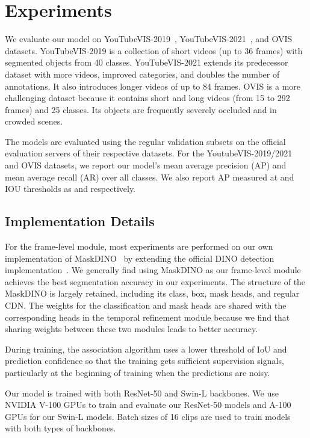 \section{Experiments}
\label{sec:experiments}

We evaluate our model on YouTubeVIS-2019~\cite{yang2019video}, YouTubeVIS-2021~\cite{youtubevis2021}, and OVIS\cite{qi2022occluded} datasets.
YouTubeVIS-2019 is a collection of short videos (up to 36 frames) with segmented objects from 40 classes.
YouTubeVIS-2021 extends its predecessor dataset with more videos, improved categories, and doubles the number of annotations. It also introduces longer videos of up to 84 frames.
OVIS is a more challenging dataset because it contains short and long videos (from 15 to 292 frames) and 25 classes. Its objects are frequently severely occluded and in crowded scenes.

The models are evaluated using the regular validation subsets on the official evaluation servers of their respective datasets. For the YoutubeVIS-2019/2021 and OVIS datasets, we report our model's mean average precision (AP) and mean average recall (AR) over all classes. We also report AP measured at  and  IOU thresholds as  and  respectively.


\subsection{Implementation Details}
\label{sec:build_model}

For the frame-level module, most experiments are performed on our own implementation of MaskDINO~\cite{li2022maskdino} by extending the official DINO detection implementation~\cite{zhang2022dino}. We generally find using MaskDINO as our frame-level module achieves the best segmentation accuracy in our experiments. The structure of the MaskDINO is largely retained, including its class, box, mask heads, and regular CDN. The weights for the classification and mask heads are shared with the corresponding heads in the temporal refinement module because we find that sharing weights between these two modules leads to better accuracy.





During training, the association algorithm uses a lower threshold of IoU and prediction confidence so that the training gets sufficient supervision signals, particularly at the beginning of training when the predictions are noisy.

Our model is trained with both ResNet-50 and Swin-L backbones. We use NVIDIA V-100 GPUs to train and evaluate our ResNet-50 models and A-100 GPUs for our Swin-L models. Batch sizes of 16 clips are used to train models with both types of backbones.



